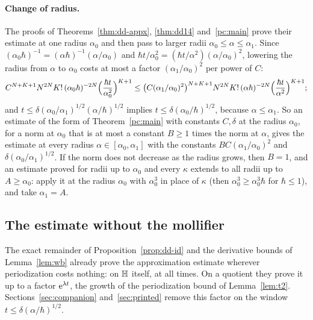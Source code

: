 \paragraph{Change of radius.} The proofs of Theorems~\ref{thm:dd-appx}, \ref{thm:dd14} and~\ref{pc:main} prove their estimate at one
radius $\alpha_0$ and then pass to larger radii $\alpha_0\le\alpha\le\alpha_1$. Since $(\alpha_0\hbar)^{-1}=(\alpha\hbar)^{-1}(\alpha/\alpha_0)$ and
$\hbar t/\alpha_0^2=(\hbar t/\alpha^2)(\alpha/\alpha_0)^2$, lowering the radius from $\alpha$ to $\alpha_0$ costs at most a factor
$(\alpha_1/\alpha_0)^{2}$ per power of $C$:
\begin{equation}\label{eq:radius}
C^{N+K+1}N^{2N}K!\,(\alpha_0\hbar)^{-2N}\Bigl(\frac{\hbar t}{\alpha_0^2}\Bigr)^{K+1}
\le\bigl(C(\alpha_1/\alpha_0)^2\bigr)^{N+K+1}N^{2N}K!\,(\alpha\hbar)^{-2N}\Bigl(\frac{\hbar t}{\alpha^2}\Bigr)^{K+1};
\end{equation}
and $t\le\delta(\alpha_0/\alpha_1)^{1/2}(\alpha/\hbar)^{1/2}$ implies $t\le\delta(\alpha_0/\hbar)^{1/2}$, because $\alpha\le\alpha_1$. So an estimate of
the form of Theorem~\ref{pc:main} with constants $C,\delta$ at the radius $\alpha_0$, for a norm at $\alpha_0$ that is at most a constant $B\ge1$
times the norm at $\alpha$, gives the estimate at every radius $\alpha\in[\alpha_0,\alpha_1]$ with the constants $BC(\alpha_1/\alpha_0)^2$ and
$\delta(\alpha_0/\alpha_1)^{1/2}$. If the norm does not decrease as the radius grows, then $B=1$, and an estimate proved for radii up to $\alpha_0$
and every $\kappa$ extends to all radii up to $A\ge\alpha_0$: apply it at the radius $\alpha_0$ with $\alpha_0^3$ in place of $\kappa$ (then
$\alpha_0^3\ge\alpha_0^3\hbar$ for $\hbar\le1$), and take $\alpha_1=A$.

\subsection{The estimate without the mollifier}\label{subsec:cover}
The exact remainder of Proposition~\ref{prop:dd-id} and the derivative bounds of Lemma~\ref{lem:wb} already prove the approximation
estimate wherever periodization costs nothing: on $\mathbb{H}$ itself, at all times. On a quotient they prove it up to a factor
$\mathrm{e}^{\lambda t}$, the growth of the periodization bound of Lemma~\ref{lem:t2}. Sections~\ref{sec:companion} and~\ref{sec:printed}
remove this factor on the window $t\le\delta(\alpha/\hbar)^{1/2}$.

